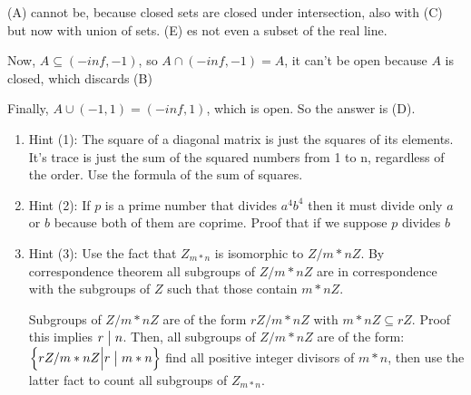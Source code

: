 \documentclass[12pt]{report}
\newcounter{it}
\theoremstyle{largebreak}
\newcommand\divides{\ensuremath{\bigm|}}
\begin{document}
    \begin{sol}
        (A) cannot be, because closed sets are closed under intersection, also with (C) but now with union of sets. (E) es not even a subset of the real line.

        Now, $A\subseteq (-inf,-1)$, so $A\cap(-inf,-1)=A$, it can't be open because $A$ is closed, which discards (B)

        Finally, $A\cup(-1,1)=(-inf,1)$, which is open. So the answer is (D).
    \end{sol}

    \begin{enumerate}
        \item Hint (1): The square of a diagonal matrix is just the squares of its elements. It's trace is just the sum of the squared numbers from 1 to n, regardless of the order. Use the formula of the sum of squares.
        \item Hint (2): If \(p\) is a prime number that divides \(a^4b^4\) then it must divide only \(a\) or \(b\) because both of them are coprime. Proof that if we suppose \(p\) divides \(b\) 
        \item Hint (3): Use the fact that $Z_{m*n}$ is isomorphic to $Z/m*nZ$. By correspondence theorem all subgroups of $Z/m*nZ$ are in correspondence with the subgroups of $Z$ such that those contain $m*nZ$.
        
        Subgroups of $Z/m*nZ$ are of the form $rZ/m*nZ$ with $m*nZ\subseteq rZ$. Proof this implies $r\divides n$. Then, all subgroups of $Z/m*nZ$ are of the form:
        $\left\{rZ/m*nZ\Big|r\divides m*n \right\}$ find all positive integer divisors of $m*n$, then use the latter fact to count all subgroups of $Z_{m*n}$. 
    \end{enumerate}

    \setcounter{section}{2}

    \begin{excer}
        
    \end{excer}
\end{document}
